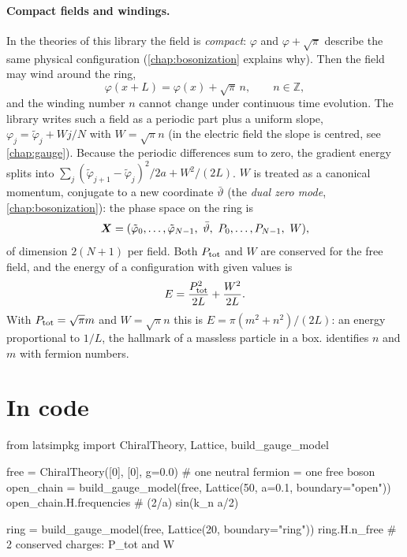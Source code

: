 \paragraph{Compact fields and windings.} In the theories of this library the field is \emph{compact}: $\varphi$
and $\varphi + \sqrt\pi$ describe the same physical configuration (\cref{chap:bosonization} explains why). Then
the field may wind around the ring,
\begin{equation}
  \varphi(x + L) = \varphi(x) + \sqrt\pi\, n,\qquad n\in\mathbb{Z},
\end{equation}
and the winding number $n$ cannot change under continuous time evolution. The library writes such a field as a
periodic part plus a uniform slope, $\varphi_j = \tilde\varphi_j + W j/N$ with $W = \sqrt\pi n$ (in the
electric field the slope is centred, see \cref{chap:gauge}). Because the
periodic differences sum to zero, the gradient energy splits into $\sum_j(\tilde\varphi_{j+1}-\tilde\varphi_j)^2/2a
+ W^2/(2L)$. $W$ is treated as a canonical momentum, conjugate to a new coordinate $\bar\vartheta$ (the
\emph{dual zero mode}, \cref{chap:bosonization}): the phase space on the ring is
\begin{equation}
  \X = (\tilde\varphi_0,\dots,\tilde\varphi_{N-1},\ \bar\vartheta,\ P_0,\dots,P_{N-1},\ W),
\end{equation}
of dimension $2(N+1)$ per field. Both $P_{\rm tot}$ and $W$ are conserved for the free field, and the energy of a
configuration with given values is
\begin{equation}\label{eq:zero-mode-energy}
  E = \frac{P_{\rm tot}^2}{2L} + \frac{W^2}{2L} .
\end{equation}
With $P_{\rm tot} = \sqrt\pi m$ and $W = \sqrt\pi n$ this is $E = \pi(m^2 + n^2)/(2L)$: an energy proportional to
$1/L$, the hallmark of a massless particle in a box.  identifies $n$ and $m$ with fermion
numbers.

\section{In code}
\begin{python}
from latsimpkg import ChiralTheory, Lattice, build_gauge_model

free = ChiralTheory([0], [0], g=0.0)          # one neutral fermion = one free boson
open_chain = build_gauge_model(free, Lattice(50, a=0.1, boundary="open"))
open_chain.H.frequencies                        # (2/a) sin(k_n a/2)

ring = build_gauge_model(free, Lattice(20, boundary="ring"))
ring.H.n_free                                   # 2 conserved charges: P_tot and W
\end{python}
